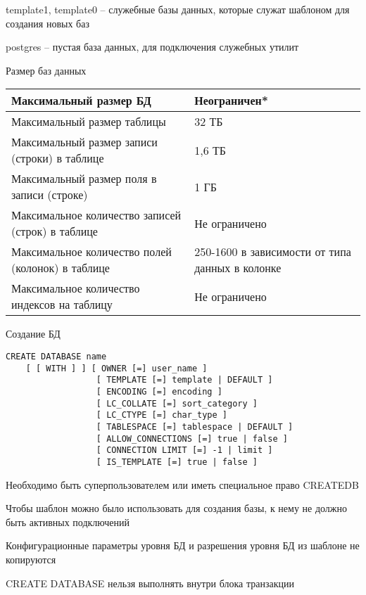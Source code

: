 \documentclass[12pt]{article}
\begin{document}
\begin{Remark}{}
    template1, template0 -- служебные базы данных, которые служат шаблоном для создания новых баз 

    postgres -- пустая база данных, для подключения служебных утилит 
\end{Remark}

\begin{nota}{Размер баз данных}
    \begin{center}
        \begin{tabular}{|m{15em}|m{20em}|}
            \hline
            Максимальный размер БД & Неограничен* \\
            \hline
            Максимальный размер таблицы & 32 ТБ \\
            \hline
            Максимальный размер записи (строки) в таблице & 1,6 ТБ \\
            \hline
            Максимальный размер поля в записи (строке) & 1 ГБ \\
            \hline
            Максимальное количество записей (строк) в таблице & Не ограничено \\
            \hline
            Максимальное количество полей (колонок) в таблице & 250-1600 в зависимости от типа данных в колонке \\
            \hline
            Максимальное количество индексов на таблицу & Не ограничено \\
            \hline
        \end{tabular}
    \end{center}
\end{nota}

\begin{nota}{Создание БД}
\begin{lstlisting}
CREATE DATABASE name 
    [ [ WITH ] ] [ OWNER [=] user_name ]
                  [ TEMPLATE [=] template | DEFAULT ]
                  [ ENCODING [=] encoding ]
                  [ LC_COLLATE [=] sort_category ]
                  [ LC_CTYPE [=] char_type ]
                  [ TABLESPACE [=] tablespace | DEFAULT ]
                  [ ALLOW_CONNECTIONS [=] true | false ]
                  [ CONNECTION LIMIT [=] -1 | limit ]
                  [ IS_TEMPLATE [=] true | false ]
\end{lstlisting}

    Необходимо быть суперпользователем или иметь специальное право CREATEDB

    Чтобы шаблон можно было использовать для создания базы, к нему не должно быть активных подключений 

    Конфигурационные параметры уровня БД и разрешения уровня БД из шаблоне не копируются

    CREATE DATABASE нельзя выполнять внутри блока транзакции 
\end{nota}
\end{document}
